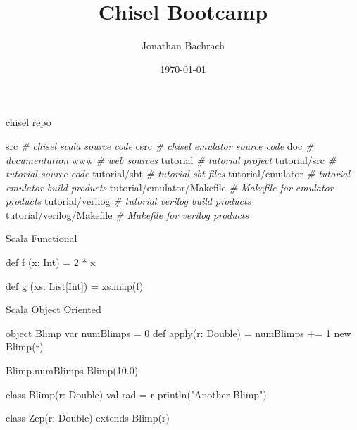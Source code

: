 \documentclass[xcolor=pdflatex,dvipsnames,table]{beamer}
\title{Chisel Bootcamp}
\author{Jonathan Bachrach}
\date{\today}
\institute[UC Berkeley]{EECS UC Berkeley}
\newenvironment{FramedSemiVerb}%
{\begin{Sbox}\begin{minipage}{.94\textwidth}\begin{semiverbatim}}%
{\end{semiverbatim}\end{minipage}\end{Sbox}
\setlength{\fboxsep}{8pt}\fbox{\TheSbox}}
\newcommand{\comment}[1]{{\color{Green}\it\smaller #1}}
\begin{document}
\begin{frame}
\titlepage
\end{frame}

\begin{frame}[fragile]{chisel repo}
\begin{FramedSemiVerb}
src                        \comment{\# chisel scala source code}
csrc                       \comment{\# chisel emulator source code}
doc                        \comment{\# documentation}
www                        \comment{\# web sources}
tutorial                   \comment{\# tutorial project}
tutorial/src               \comment{\# tutorial source code}
tutorial/sbt               \comment{\# tutorial sbt files}
tutorial/emulator          \comment{\# tutorial emulator build products}
tutorial/emulator/Makefile \comment{\# Makefile for emulator products} 
tutorial/verilog           \comment{\# tutorial verilog build products} 
tutorial/verilog/Makefile  \comment{\# Makefile for verilog products} 
\end{FramedSemiVerb}
\end{frame}

% 
% 
% 

\begin{frame}[fragile]{Scala Functional}

\begin{scala}
def f (x: Int) = 2 * x

def g (xs: List[Int]) =  xs.map(f)
\end{scala}
\end{frame}

\begin{frame}[fragile]{Scala Object Oriented}

\begin{scala}
object Blimp {
  var numBlimps = 0
  def apply(r: Double) = {
    numBlimps += 1
    new Blimp(r)
  }
}

Blimp.numBlimps
Blimp(10.0)

class Blimp(r: Double) {
  val rad = r
  println("Another Blimp")
}

class Zep(r: Double) extends Blimp(r)
\end{scala}

\end{frame}
\end{document}
